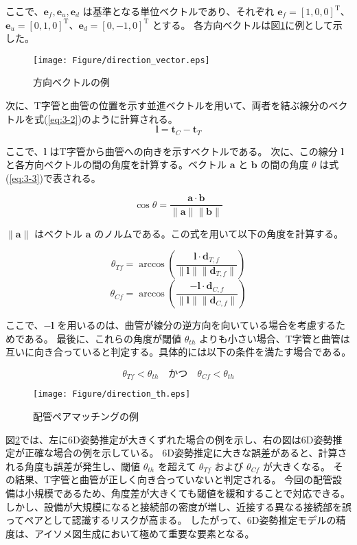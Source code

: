 ここで、$\mathbf{e}_f, \mathbf{e}_u, \mathbf{e}_d$ は基準となる単位ベクトルであり、それぞれ $\mathbf{e}_f = [1, 0, 0]^\mathrm{T}$、$\mathbf{e}_u = [0, 1, 0]^\mathrm{T}$、$\mathbf{e}_d = [0, -1, 0]^\mathrm{T}$ とする。
各方向ベクトルは図\ref{fig:3-f2}に例として示した。
\begin{figure}[htbt]
  \centering
   \texttt{[image: Figure/direction\_vector.eps]}
   \caption{方向ベクトルの例}
   \label{fig:3-f2}
\end{figure}

次に、T字管と曲管の位置を示す並進ベクトルを用いて、両者を結ぶ線分のベクトルを式(\ref{eq:3-2})のように計算される。
\begin{equation}
\mathbf{l} = \mathbf{t}_C - \mathbf{t}_T
\label{eq:3-2}
\end{equation}

ここで、$\mathbf{l}$ はT字管から曲管への向きを示すベクトルである。
次に、この線分 $\mathbf{l}$ と各方向ベクトルの間の角度を計算する。ベクトル $\mathbf{a}$ と $\mathbf{b}$ の間の角度 $\theta$ は式(\ref{eq:3-3})で表される。

\begin{equation}
\cos \theta = \frac{\mathbf{a} \cdot \mathbf{b}}{\|\mathbf{a}\| \|\mathbf{b}\|}
\label{eq:3-3}
\end{equation}

$\|\mathbf{a}\|$ はベクトル $\mathbf{a}$ のノルムである。この式を用いて以下の角度を計算する。

\begin{equation}
\theta_{Tf} = \arccos \left( \frac{\mathbf{l} \cdot \mathbf{d}_{T,f}}{\|\mathbf{l}\| \|\mathbf{d}_{T,f}\|} \right)
\label{eq:3-4}
\end{equation}
\begin{equation}
\theta_{Cf} = \arccos \left( \frac{-\mathbf{l} \cdot \mathbf{d}_{C,f}}{\|\mathbf{l}\| \|\mathbf{d}_{C,f}\|} \right)
\label{eq:3-5}
\end{equation}

ここで、$-\mathbf{l}$ を用いるのは、曲管が線分の逆方向を向いている場合を考慮するためである。
最後に、これらの角度が閾値 $\theta_{th}$ よりも小さい場合、T字管と曲管は互いに向き合っていると判定する。具体的には以下の条件を満たす場合である。

\[
\theta_{Tf} < \theta_{th} \quad \text{かつ} \quad \theta_{Cf} < \theta_{th}
\]

\begin{figure}[htbt]
  \centering
   \texttt{[image: Figure/direction\_th.eps]}
   \caption{配管ペアマッチングの例}
   \label{fig:3-f3}
\end{figure}
図\ref{fig:3-f3}では、左に6D姿勢推定が大きくずれた場合の例を示し、右の図は6D姿勢推定が正確な場合の例を示している。
6D姿勢推定に大きな誤差があると、計算される角度も誤差が発生し、閾値 $\theta_{th}$ を超えて $\theta_{Tf}$ および $\theta_{Cf}$ が大きくなる。
その結果、T字管と曲管が正しく向き合っていないと判定される。
今回の配管設備は小規模であるため、角度差が大きくても閾値を緩和することで対応できる。
しかし、設備が大規模になると接続部の密度が増し、近接する異なる接続部を誤ってペアとして認識するリスクが高まる。
したがって、6D姿勢推定モデルの精度は、アイソメ図生成において極めて重要な要素となる。

